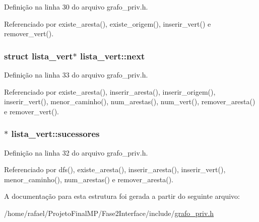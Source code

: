 Definição na linha 30 do arquivo grafo\+\_\+priv.\+h.



Referenciado por existe\+\_\+aresta(), existe\+\_\+origem(), inserir\+\_\+vert() e remover\+\_\+vert().

\hypertarget{structlista__vert_a772eebf412b0d7e40a73f5989e6a1835}{}
\subsubsection[{next}]{\setlength{\rightskip}{0pt plus 5cm}struct {\bf lista\+\_\+vert}$\ast$ lista\+\_\+vert\+::next}\label{structlista__vert_a772eebf412b0d7e40a73f5989e6a1835}


Definição na linha 33 do arquivo grafo\+\_\+priv.\+h.



Referenciado por existe\+\_\+aresta(), inserir\+\_\+aresta(), inserir\+\_\+origem(), inserir\+\_\+vert(), menor\+\_\+caminho(), num\+\_\+arestas(), num\+\_\+vert(), remover\+\_\+aresta() e remover\+\_\+vert().

\hypertarget{structlista__vert_ac003e2d2beffcf2432cac5460cf82263}{}
\subsubsection[{sucessores}]{$\ast$ lista\+\_\+vert\+::sucessores}\label{structlista__vert_ac003e2d2beffcf2432cac5460cf82263}


Definição na linha 32 do arquivo grafo\+\_\+priv.\+h.



Referenciado por dfs(), existe\+\_\+aresta(), inserir\+\_\+aresta(), inserir\+\_\+vert(), menor\+\_\+caminho(), num\+\_\+arestas() e remover\+\_\+aresta().



A documentação para esta estrutura foi gerada a partir do seguinte arquivo\+:\begin{DoxyCompactItemize}
\item 
/home/rafael/\+Projeto\+Final\+M\+P/\+Fase2\+Interface/include/\hyperlink{grafo__priv_8h}{grafo\+\_\+priv.\+h}\end{DoxyCompactItemize}
